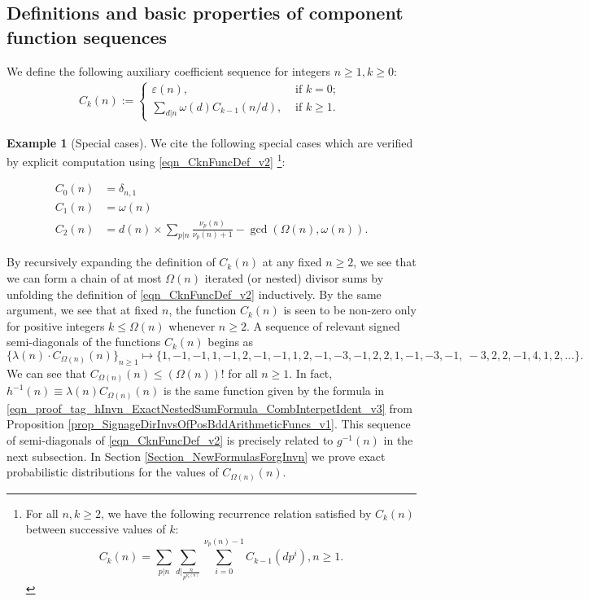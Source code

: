 \documentclass[11pt,reqno,a4letter]{article}
\numberwithin{figure}{section}
\numberwithin{table}{section}
\newcommand{\seqnum}[1]{\href{http://oeis.org/#1}{\color{ProcessBlue}{\underline{#1}}}}
\theoremstyle{plain}
\numberwithin{theorem}{section}
\theoremstyle{definition}
\newtheorem{example}[theorem]{Example}
\newcommand{\NBRef}[1]{}
\begin{document}
\subsection{Definitions and basic properties of component function sequences} 

We define the following auxiliary coefficient sequence for integers $n \geq 1, k \geq 0$: 
\begin{align} 
\label{eqn_CknFuncDef_v2} 
C_k(n) := \begin{cases} 
     \varepsilon(n), & \text{ if $k = 0$; } \\ 
     \sum\limits_{d|n} \omega(d) C_{k-1}(n/d), & \text{ if $k \geq 1$. } 
     \end{cases} 
\end{align} 

\begin{example}[Special cases] 
\label{example_SpCase_Ckn} 
We cite the following special cases which are verified by 
explicit computation using \eqref{eqn_CknFuncDef_v2} 
\cite[\seqnum{A066922}]{OEIS}\footnote{ 
     For all $n,k \geq 2$, we have the following recurrence 
     relation satisfied by $C_k(n)$ between successive values of $k$: 
     \begin{equation*}
     C_k(n) = \sum_{p|n} \sum_{d\rvert\frac{n}{p^{\nu_p(n)}}} \sum_{i=0}^{\nu_p(n)-1} 
          C_{k-1}\left(dp^i\right), n \geq 1. 
     \end{equation*}
}: 
\NBRef{A07-2020-04-26} 
\begin{align*} 
C_0(n) & = \delta_{n,1} \\ 
C_1(n) & = \omega(n) \\ 
C_2(n) & = d(n) \times \sum_{p|n} \frac{\nu_p(n)}{\nu_p(n)+1} - \gcd\left(\Omega(n), \omega(n)\right). 
\end{align*} 
\end{example} 

By recursively expanding the definition of $C_k(n)$ 
at any fixed $n \geq 2$, we see that 
we can form a chain of at most $\Omega(n)$ iterated (or nested) divisor sums by 
unfolding the definition of \eqref{eqn_CknFuncDef_v2} inductively. 
By the same argument, we see that at fixed $n$, the function 
$C_k(n)$ is seen to be non-zero only for positive integers 
$k \leq \Omega(n)$ whenever $n \geq 2$. 
A sequence of relevant signed semi-diagonals of the functions $C_k(n)$ begins as 
\cite[\seqnum{A008480}]{OEIS} 
\[
\{\lambda(n) \cdot C_{\Omega(n)}(n) \}_{n \geq 1} \mapsto \{
     1, -1, -1, 1, -1, 2, -1, -1, 1, 2, -1, -3, -1, 2, 2, 1, -1, -3, -1, \
     -3, 2, 2, -1, 4, 1, 2, \ldots \}. 
\]
We can see that $C_{\Omega(n)}(n) \leq (\Omega(n))!$ for all $n \geq 1$. In fact, 
$h^{-1}(n) \equiv \lambda(n) C_{\Omega(n)}(n)$ is the same function given by 
the formula in \eqref{eqn_proof_tag_hInvn_ExactNestedSumFormula_CombInterpetIdent_v3} from 
Proposition \ref{prop_SignageDirInvsOfPosBddArithmeticFuncs_v1}. 
This sequence of semi-diagonals of 
\eqref{eqn_CknFuncDef_v2} 
is precisely related to $g^{-1}(n)$ in the next subsection. 
In Section \ref{Section_NewFormulasForgInvn} 
we prove exact probabilistic distributions for the values of 
$C_{\Omega(n)}(n)$. 
\end{document}

